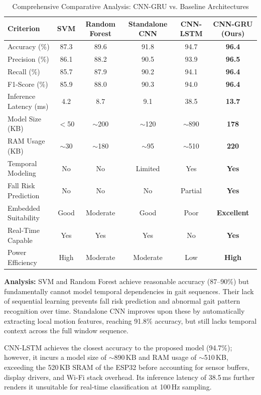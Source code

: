 \documentclass[conference]{IEEEtran}
\begin{document}
\begin{table}[!t]
\centering
\caption{Comprehensive Comparative Analysis: CNN-GRU vs. Baseline Architectures}
\label{tab:comp}
\renewcommand{\arraystretch}{1.2}
\begin{tabular}{|l|c|c|c|c|c|}
\hline
\textbf{Criterion} & \textbf{SVM} & \textbf{Random Forest} & \textbf{Standalone CNN} & \textbf{CNN-LSTM} & \textbf{CNN-GRU (Ours)} \\
\hline
Accuracy (\%) & 87.3 & 89.6 & 91.8 & 94.7 & \textbf{96.4} \\
Precision (\%) & 86.1 & 88.2 & 90.5 & 93.9 & \textbf{96.5} \\
Recall (\%) & 85.7 & 87.9 & 90.2 & 94.1 & \textbf{96.4} \\
F1-Score (\%) & 85.9 & 88.0 & 90.3 & 94.0 & \textbf{96.4} \\
\hline
Inference Latency (ms) & 4.2 & 8.7 & 9.1 & 38.5 & \textbf{13.7} \\
Model Size (KB) & $<$50 & $\sim$200 & $\sim$120 & $\sim$890 & \textbf{178} \\
RAM Usage (KB) & $\sim$30 & $\sim$180 & $\sim$95 & $\sim$510 & \textbf{220} \\
\hline
Temporal Modeling & No & No & Limited & Yes & \textbf{Yes} \\
Fall Risk Prediction & No & No & No & Partial & \textbf{Yes} \\
Embedded Suitability & Good & Moderate & Good & Poor & \textbf{Excellent} \\
Real-Time Capable & Yes & Yes & Yes & No & \textbf{Yes} \\
Power Efficiency & High & Moderate & Moderate & Low & \textbf{High} \\
\hline
\end{tabular}
\end{table}

\textbf{Analysis:} SVM and Random Forest achieve reasonable accuracy (87--90\%) but fundamentally cannot model temporal dependencies in gait sequences. Their lack of sequential learning prevents fall risk prediction and abnormal gait pattern recognition over time. Standalone CNN improves upon these by automatically extracting local motion features, reaching 91.8\% accuracy, but still lacks temporal context across the full window sequence.

CNN-LSTM achieves the closest accuracy to the proposed model (94.7\%); however, it incurs a model size of $\sim$890\,KB and RAM usage of $\sim$510\,KB, exceeding the 520\,KB SRAM of the ESP32 before accounting for sensor buffers, display drivers, and Wi-Fi stack overhead. Its inference latency of 38.5\,ms further renders it unsuitable for real-time classification at 100\,Hz sampling.
\end{document}
